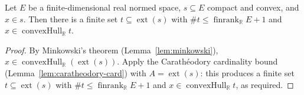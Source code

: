 \begin{theorem}
    \label{thm:minkowski-caratheodory}
    \leanok
    Let $E$ be a finite-dimensional real normed space, $s \subseteq E$ compact and
    convex, and $x \in s$. Then there is a finite set $t \subseteq \operatorname{ext}(s)$
    with $\#t \le \operatorname{finrank}_{\mathbb R} E + 1$ and
    $x \in \operatorname{convexHull}_{\mathbb R} t$.
\end{theorem}
\begin{proof}
    By Minkowski's theorem (Lemma~\ref{lem:minkowski}),
    $x \in \operatorname{convexHull}_{\mathbb R}(\operatorname{ext}(s))$. Apply the
    Carathéodory cardinality bound (Lemma~\ref{lem:caratheodory-card}) with
    $A = \operatorname{ext}(s)$: this produces a finite set
    $t \subseteq \operatorname{ext}(s)$ with
    $\#t \le \operatorname{finrank}_{\mathbb R} E + 1$ and
    $x \in \operatorname{convexHull}_{\mathbb R} t$, as required.
\end{proof}


